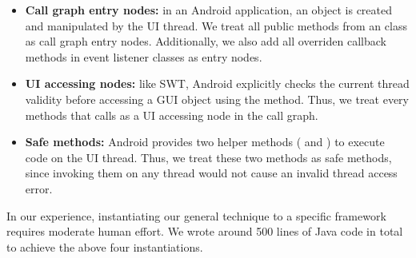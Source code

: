 

\begin{itemize}

\item \textbf{Call graph entry nodes: } in an Android application,
an  object is created and manipulated by the UI thread. We treat
all public methods from an  class as call graph entry nodes. Additionally,
we also add all overriden callback methods in event listener classes as entry nodes.

\item \textbf{UI accessing nodes: } like SWT, Android explicitly checks the current
thread validity before accessing a GUI object using the  method.
Thus, we treat every methods that calls  as a UI accessing node
in the call graph.

\item \textbf{Safe methods: } Android provides two helper methods (
and ) to execute code on the UI thread. Thus, we treat
these two methods as safe methods, since invoking them on any thread
would not cause an invalid thread access error.

\end{itemize}


In our experience, instantiating our general technique to  a specific framework
requires moderate human effort. We wrote around 500 lines of Java code in total to achieve
the above four instantiations.
